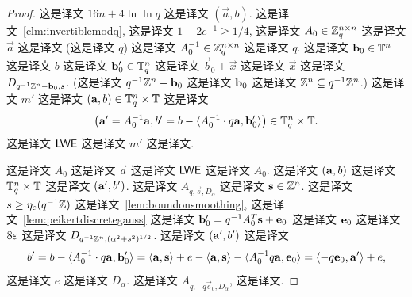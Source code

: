 \begin{proof}
  这是译文 $16n + 4\ln\ln q$ 这是译文 $(\vec{a},b)$.  这是译文~\ref{clm:invertiblemodq}, 这是译文  $1-2e^{-1} \ge 1/4$, 这是译文 $A_0 \in \mathbb{Z}_q^{n \times n}$ 这是译文 $\vec{a}$ 这是译文 (这是译文 $q$)  这是译文 $A_0^{-1} \in \mathbb{Z}_q^{n \times n}$ 这是译文 $q$. 这是译文 $\mathbf{b}_0 \in \mathbb{T}^n$ 这是译文 $b$ 这是译文 $\mathbf{b}'_0 \in \mathbb{T}_q^n$ 这是译文 $\vec{b}_0 + \vec{x}$ 这是译文 $\vec{x}$ 这是译文 $D_{q^{-1}\mathbb{Z}^n - \mathbf{b}_0,s}$.  (这是译文 $q^{-1}\mathbb{Z}^n - \mathbf{b}_0$ 这是译文 $\mathbf{b}_0$ 这是译文 $\mathbb{Z}^{n} \subseteq q^{-1}\mathbb{Z}^n$.)  这是译文 $m'$ 这是译文 $(\mathbf{a},b) \in \mathbb{T}_q^n \times \mathbb{T}$ 这是译文  \[
	  \big(\mathbf{a}' = A_0^{-1} \mathbf{a}, b' = b - \langle A_0^{-1} \cdot q \mathbf{a}, \mathbf{b}'_0\rangle\big) \in \mathbb{T}_q^n \times \mathbb{T}.
	\]  这是译文 $\mathsf{LWE}$ 这是译文 $m'$ 这是译文. 
		
	这是译文 $A_0$ 这是译文 $\vec{a}$ 这是译文 $\mathsf{LWE}$ 这是译文 $A_0$.  这是译文 $(\mathbf{a},b)$ 这是译文 $\mathbb{T}_q^n \times \mathbb{T}$  这是译文 $(\mathbf{a}',b')$.  这是译文 $A_{q,\vec{s},D_{\alpha}}$  这是译文 $\mathbf{s} \in \mathbb{Z}^n$. 这是译文~$s \geq \eta_{\varepsilon}(q^{-1}\mathbb{Z})$ 这是译文~\ref{lem:boundonsmoothing},  这是译文~\ref{lem:peikertdiscretegauss} 这是译文 $\mathbf{b}_0' = q^{-1} A_0^T \mathbf{s} + \mathbf{e}_0$  这是译文 $\mathbf{e}_0$ 这是译文 $8\varepsilon$ 这是译文 $D_{q^{-1}\mathbb{Z}^n, (\alpha^2+s^2)^{1/2}}$.  这是译文 $(\mathbf{a}',b')$ 这是译文  \[
	   b' = b - \langle A_0^{-1} \cdot q \mathbf{a}, \mathbf{b}'_0\rangle 
		    = \langle\mathbf{a},\mathbf{s}\rangle+ e - \langle\mathbf{a}, \mathbf{s}\rangle - \langle A_0^{-1} q \mathbf{a}, \mathbf{e}_0\rangle
				= \langle-q \mathbf{e}_0, \mathbf{a}'\rangle+e,
	\]  这是译文 $e$ 这是译文 $D_\alpha$. 这是译文 $A_{q,-q\vec{e}_0,D_{\alpha}}$, 这是译文.
\end{proof}


